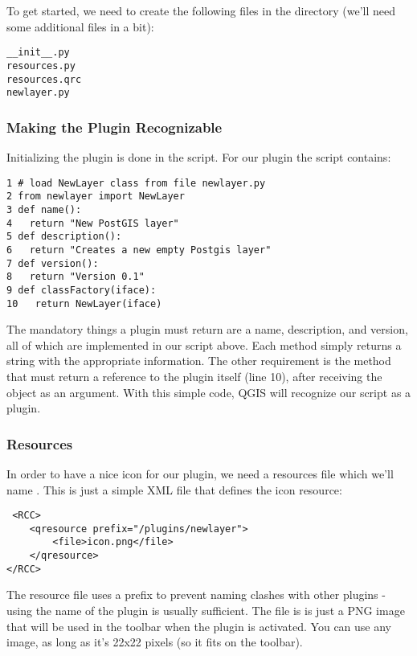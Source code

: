 To get started, we need to create the following files in the  directory (we'll need some additional files in a bit):

\begin{verbatim}
__init__.py 
resources.py
resources.qrc
newlayer.py
\end{verbatim} 

\subsubsection{Making the Plugin Recognizable}

Initializing the plugin is done in the  script.
For our  plugin the script contains:

\begin{verbatim}
1 # load NewLayer class from file newlayer.py
2 from newlayer import NewLayer
3 def name():
4   return "New PostGIS layer"
5 def description():
6   return "Creates a new empty Postgis layer"
7 def version():
8   return "Version 0.1"
9 def classFactory(iface):
10   return NewLayer(iface)
\end{verbatim} 

The mandatory things a plugin must return are a name, description, and version, all of which are implemented in our script above.
Each method simply returns a string with the appropriate information.
The other requirement is the  method that must return a reference to the plugin itself (line 10), after receiving the  object as an argument.
With this simple code, QGIS will recognize our script as a plugin.

\subsubsection{Resources}

In order to have a nice icon for our plugin, we need a resources file which we'll name .
This is just a simple XML file that defines the icon resource:

\begin{verbatim}
 <RCC>
    <qresource prefix="/plugins/newlayer">
        <file>icon.png</file>
    </qresource>
</RCC> 
\end{verbatim} 

The resource file uses a prefix to prevent naming clashes with other plugins - using the name of the plugin is usually sufficient.
The  file is is just a PNG image that will be used in the toolbar when the plugin is activated.
You can use any image, as long as it's 22x22 pixels (so it fits on the toolbar).

